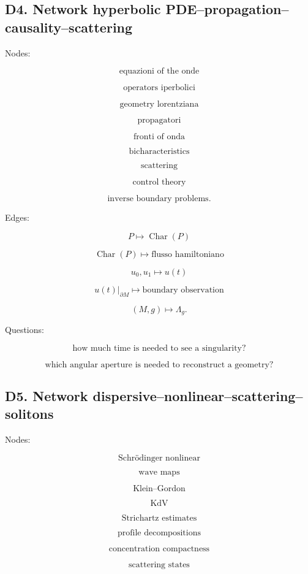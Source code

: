 \documentclass[11pt]{article}
\begin{document}
\subsection{D4. Network hyperbolic PDE--propagation--causality--scattering}

Nodes:

\[
\text{equazioni of the onde}
\]

\[
\text{operators iperbolici}
\]

\[
\text{geometry lorentziana}
\]

\[
\text{propagatori}
\]

\[
\text{fronti of onda}
\]

\[
\text{bicharacteristics}
\]

\[
\text{scattering}
\]

\[
\text{control theory}
\]

\[
\text{inverse boundary problems}.
\]

Edges:

\[
P\mapsto \operatorname{Char}(P)
\]

\[
\operatorname{Char}(P)\mapsto \text{flusso hamiltoniano}
\]

\[
u_0,u_1\mapsto u(t)
\]

\[
u(t)|_{\partial M}\mapsto \text{boundary observation}
\]

\[
(M,g)\mapsto \Lambda_g.
\]

Questions:

\[
\text{how much time is needed to see a singularity?}
\]

\[
\text{which angular aperture is needed to reconstruct a geometry?}
\]



\subsection{D5. Network dispersive--nonlinear--scattering--solitons}

Nodes:

\[
\text{Schrödinger nonlinear}
\]

\[
\text{wave maps}
\]

\[
\text{Klein--Gordon}
\]

\[
\text{KdV}
\]

\[
\text{Strichartz estimates}
\]

\[
\text{profile decompositions}
\]

\[
\text{concentration compactness}
\]

\[
\text{scattering states}
\]
\end{document}
